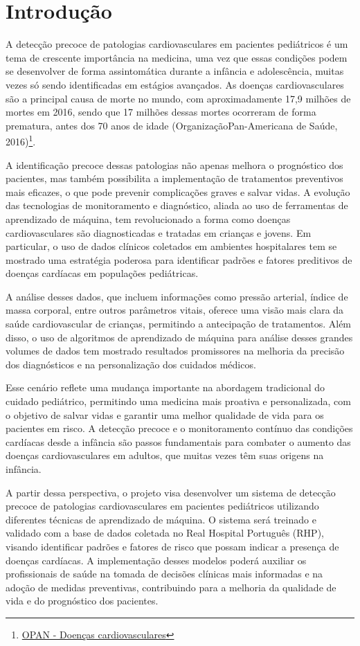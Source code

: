 \documentclass[10pt, conference, compsocconf]{IEEEtran}
\begin{document}
\section{Introdução}
A detecção precoce de patologias cardiovasculares em pacientes pediátricos é um tema de crescente importância na medicina, uma vez que essas condições podem se desenvolver de 
forma assintomática durante a infância e adolescência, muitas vezes só sendo identificadas em estágios avançados. As doenças cardiovasculares são a principal causa de morte no mundo, 
com aproximadamente 17,9 milhões de mortes em 2016, sendo que 17 milhões dessas mortes ocorreram de forma prematura, antes dos 70 anos de idade (OrganizaçãoPan-Americana de Saúde, 2016)\footnote{\href{https://www.paho.org/pt/topicos/doencas-cardiovasculares}{OPAN - Doenças cardiovasculares}}. 

A identificação precoce dessas patologias não apenas melhora o prognóstico dos pacientes, mas também possibilita a implementação de tratamentos preventivos mais eficazes, o que pode 
prevenir complicações graves e salvar vidas. A evolução das tecnologias de monitoramento e diagnóstico, aliada ao uso de ferramentas de aprendizado de máquina, tem revolucionado a forma 
como doenças cardiovasculares são diagnosticadas e tratadas em crianças e jovens. Em particular, o uso de dados clínicos coletados em ambientes hospitalares tem se mostrado uma estratégia 
poderosa para identificar padrões e fatores preditivos de doenças cardíacas em populações pediátricas. 

A análise desses dados, que incluem informações como pressão arterial, índice de
massa corporal, entre outros parâmetros vitais, oferece uma visão mais clara da saúde cardiovascular de crianças, permitindo a antecipação de tratamentos. Além disso, o uso de algoritmos 
de aprendizado de máquina para análise desses grandes volumes de dados tem mostrado resultados promissores na melhoria da precisão dos diagnósticos e na personalização dos cuidados 
médicos. 

Esse cenário reflete uma mudança importante na abordagem tradicional do cuidado pediátrico, permitindo uma medicina mais proativa e personalizada, com o objetivo de salvar vidas 
e garantir uma melhor qualidade de vida para os pacientes em risco. A detecção precoce e o monitoramento contínuo das condições cardíacas desde a infância são passos fundamentais para 
combater o aumento das doenças cardiovasculares em adultos, que muitas vezes têm suas origens na infância.

A partir dessa perspectiva, o projeto visa desenvolver um sistema de detecção precoce de patologias cardiovasculares em pacientes pediátricos 
utilizando diferentes técnicas de aprendizado de máquina. O sistema será treinado e validado com a base de dados coletada no Real Hospital Português (RHP), visando identificar padrões 
e fatores de risco que possam indicar a presença de doenças cardíacas. A implementação desses modelos poderá auxiliar os profissionais de saúde na tomada de decisões clínicas 
mais informadas e na adoção de medidas preventivas, contribuindo para a melhoria da qualidade de vida e do prognóstico dos pacientes.
\end{document}

